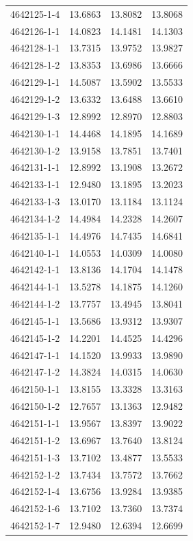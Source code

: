 \begin{longtable}{lrrr}
4642125-1-4 & 13.6863 & 13.8082 & 13.8068 \\
4642126-1-1 & 14.0823 & 14.1481 & 14.1303 \\
4642128-1-1 & 13.7315 & 13.9752 & 13.9827 \\
4642128-1-2 & 13.8353 & 13.6986 & 13.6666 \\
4642129-1-1 & 14.5087 & 13.5902 & 13.5533 \\
4642129-1-2 & 13.6332 & 13.6488 & 13.6610 \\
4642129-1-3 & 12.8992 & 12.8970 & 12.8803 \\
4642130-1-1 & 14.4468 & 14.1895 & 14.1689 \\
4642130-1-2 & 13.9158 & 13.7851 & 13.7401 \\
4642131-1-1 & 12.8992 & 13.1908 & 13.2672 \\
4642133-1-1 & 12.9480 & 13.1895 & 13.2023 \\
4642133-1-3 & 13.0170 & 13.1184 & 13.1124 \\
4642134-1-2 & 14.4984 & 14.2328 & 14.2607 \\
4642135-1-1 & 14.4976 & 14.7435 & 14.6841 \\
4642140-1-1 & 14.0553 & 14.0309 & 14.0080 \\
4642142-1-1 & 13.8136 & 14.1704 & 14.1478 \\
4642144-1-1 & 13.5278 & 14.1875 & 14.1260 \\
4642144-1-2 & 13.7757 & 13.4945 & 13.8041 \\
4642145-1-1 & 13.5686 & 13.9312 & 13.9307 \\
4642145-1-2 & 14.2201 & 14.4525 & 14.4296 \\
4642147-1-1 & 14.1520 & 13.9933 & 13.9890 \\
4642147-1-2 & 14.3824 & 14.0315 & 14.0630 \\
4642150-1-1 & 13.8155 & 13.3328 & 13.3163 \\
4642150-1-2 & 12.7657 & 13.1363 & 12.9482 \\
4642151-1-1 & 13.9567 & 13.8397 & 13.9022 \\
4642151-1-2 & 13.6967 & 13.7640 & 13.8124 \\
4642151-1-3 & 13.7102 & 13.4877 & 13.5533 \\
4642152-1-2 & 13.7434 & 13.7572 & 13.7662 \\
4642152-1-4 & 13.6756 & 13.9284 & 13.9385 \\
4642152-1-6 & 13.7102 & 13.7360 & 13.7374 \\
4642152-1-7 & 12.9480 & 12.6394 & 12.6699 \\

\end{longtable}
